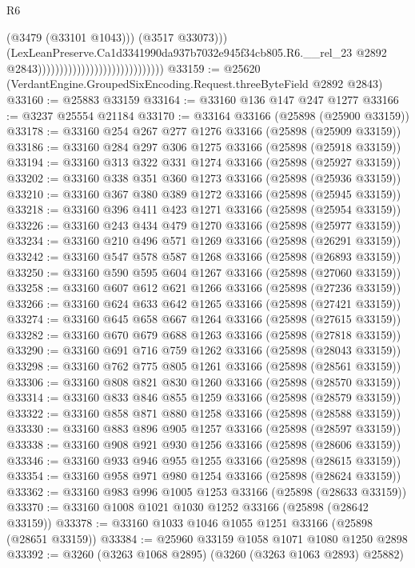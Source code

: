 \begin{lexlean}{R6}
\begin{coremodule}
                                                                  (@3479 (@33101 @1043)))
                                                                (@3517 @33073)))
                                                            (LexLeanPreserve.Ca1d3341990da937b7032e945f34cb805.R6.__rel_23
                                                              @2892
                                                              @2843)))))))))))))))))))))))))))))
@33159 := @25620 (VerdantEngine.GroupedSixEncoding.Request.threeByteField @2892 @2843)
@33160 := @25883 @33159
@33164 := @33160 @136 @147 @247 @1277
@33166 := @3237 @25554 @21184
@33170 := @33164 @33166 (@25898 (@25900 @33159))
@33178 := @33160 @254 @267 @277 @1276 @33166 (@25898 (@25909 @33159))
@33186 := @33160 @284 @297 @306 @1275 @33166 (@25898 (@25918 @33159))
@33194 := @33160 @313 @322 @331 @1274 @33166 (@25898 (@25927 @33159))
@33202 := @33160 @338 @351 @360 @1273 @33166 (@25898 (@25936 @33159))
@33210 := @33160 @367 @380 @389 @1272 @33166 (@25898 (@25945 @33159))
@33218 := @33160 @396 @411 @423 @1271 @33166 (@25898 (@25954 @33159))
@33226 := @33160 @243 @434 @479 @1270 @33166 (@25898 (@25977 @33159))
@33234 := @33160 @210 @496 @571 @1269 @33166 (@25898 (@26291 @33159))
@33242 := @33160 @547 @578 @587 @1268 @33166 (@25898 (@26893 @33159))
@33250 := @33160 @590 @595 @604 @1267 @33166 (@25898 (@27060 @33159))
@33258 := @33160 @607 @612 @621 @1266 @33166 (@25898 (@27236 @33159))
@33266 := @33160 @624 @633 @642 @1265 @33166 (@25898 (@27421 @33159))
@33274 := @33160 @645 @658 @667 @1264 @33166 (@25898 (@27615 @33159))
@33282 := @33160 @670 @679 @688 @1263 @33166 (@25898 (@27818 @33159))
@33290 := @33160 @691 @716 @759 @1262 @33166 (@25898 (@28043 @33159))
@33298 := @33160 @762 @775 @805 @1261 @33166 (@25898 (@28561 @33159))
@33306 := @33160 @808 @821 @830 @1260 @33166 (@25898 (@28570 @33159))
@33314 := @33160 @833 @846 @855 @1259 @33166 (@25898 (@28579 @33159))
@33322 := @33160 @858 @871 @880 @1258 @33166 (@25898 (@28588 @33159))
@33330 := @33160 @883 @896 @905 @1257 @33166 (@25898 (@28597 @33159))
@33338 := @33160 @908 @921 @930 @1256 @33166 (@25898 (@28606 @33159))
@33346 := @33160 @933 @946 @955 @1255 @33166 (@25898 (@28615 @33159))
@33354 := @33160 @958 @971 @980 @1254 @33166 (@25898 (@28624 @33159))
@33362 := @33160 @983 @996 @1005 @1253 @33166 (@25898 (@28633 @33159))
@33370 := @33160 @1008 @1021 @1030 @1252 @33166 (@25898 (@28642 @33159))
@33378 := @33160 @1033 @1046 @1055 @1251 @33166 (@25898 (@28651 @33159))
@33384 := @25960 @33159 @1058 @1071 @1080 @1250 @2898
@33392 := @3260 (@3263 @1068 @2895) (@3260 (@3263 @1063 @2893) @25882)

\end{coremodule}
\end{lexlean}
